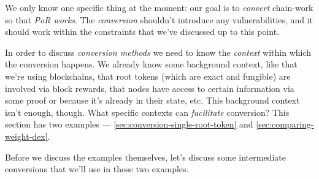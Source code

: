 We only know one specific thing at the moment: our goal is to \emph{convert} chain-work so that \emph{PoR works}.
The \emph{conversion} shouldn't introduce any vulnerabilities, and it should work within the constraints that we've discussed up to this point.

In order to discuss \emph{conversion methods} we need to know the \emph{context} within which the conversion happens.
We already know some background context, like that we're using blockchains, that root tokens (which are exact and fungible) are involved via block rewards, that nodes have access to certain information via some proof or because it's already in their state, etc.
This background context isn't enough, though.
What specific contexts can \emph{facilitate} conversion?
This section has two examples --- \autoref{sec:conversion-single-root-token} and \autoref{sec:comparing-weight-dex}.

Before we discuss the examples themselves, let's discuss some intermediate conversions that we'll use in those two examples.
